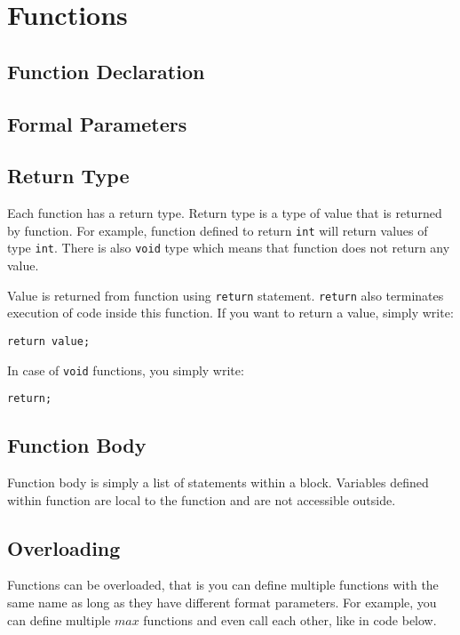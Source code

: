 
\chapter{Functions}
\label{chap:cbot_functions}

\section{Function Declaration}


\section{Formal Parameters}


\section{Return Type}
Each function has a return type. Return type is a type of value that is returned by function. For example, function defined to return \texttt{int} will return values of type \texttt{int}. There is also \texttt{void} type which means that function does not return any value.

Value is returned from function using \texttt{return} statement. \texttt{return} also terminates execution of code inside this function. If you want to return a value, simply write:

\begin{lstlisting}
return value;
\end{lstlisting}

In case of \texttt{void} functions, you simply write:

\begin{lstlisting}
return;
\end{lstlisting}


\section{Function Body}
Function body is simply a list of statements within a block. Variables defined within function are local to the function and are not accessible outside.


\section{Overloading}
Functions can be overloaded, that is you can define multiple functions with the same name as long as they have different format parameters. For example, you can define multiple $max$ functions and even call each other, like in code below.

